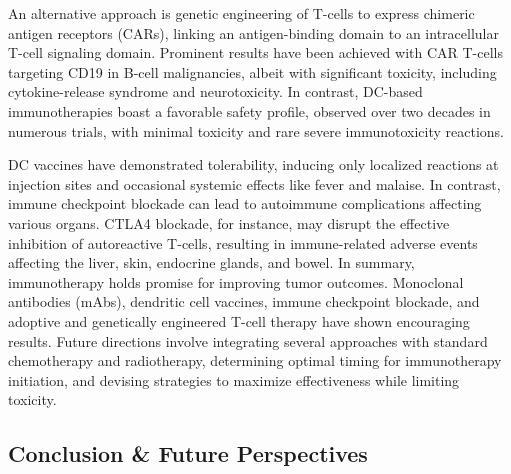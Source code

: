 \documentclass[
]{article}
\begin{document}
An alternative approach is genetic engineering of T-cells to express
chimeric antigen receptors (CARs), linking an antigen-binding domain to
an intracellular T-cell signaling domain. Prominent results have been
achieved with CAR T-cells targeting CD19 in B-cell malignancies, albeit
with significant toxicity, including cytokine-release syndrome and
neurotoxicity. In contrast, DC-based immunotherapies boast a favorable
safety profile, observed over two decades in numerous trials, with
minimal toxicity and rare severe immunotoxicity reactions.

DC vaccines have demonstrated tolerability, inducing only localized
reactions at injection sites and occasional systemic effects like fever
and malaise. In contrast, immune checkpoint blockade can lead to
autoimmune complications affecting various organs. CTLA4 blockade, for
instance, may disrupt the effective inhibition of autoreactive T-cells,
resulting in immune-related adverse events affecting the liver, skin,
endocrine glands, and bowel. In summary, immunotherapy holds promise for
improving tumor outcomes. Monoclonal antibodies (mAbs), dendritic cell
vaccines, immune checkpoint blockade, and adoptive and genetically
engineered T-cell therapy have shown encouraging results. Future
directions involve integrating several approaches with standard
chemotherapy and radiotherapy, determining optimal timing for
immunotherapy initiation, and devising strategies to maximize
effectiveness while limiting toxicity.

\subsection{Conclusion \& Future
Perspectives}\label{conclusion-future-perspectives}
\end{document}
